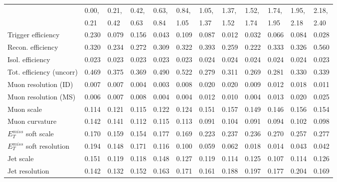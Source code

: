 {
\begin{table}
  \begin{center}
\tiny
\begin{tabular}{l|p{0.6cm}p{0.6cm}p{0.6cm}p{0.6cm}p{0.6cm}p{0.6cm}p{0.6cm}p{0.6cm}p{0.6cm}p{0.6cm}p{0.6cm}}
\hline
   & 0.00, & 0.21, & 0.42, & 0.63, & 0.84, & 1.05, & 1.37, & 1.52, & 1.74, & 1.95, & 2.18,  \\ 
   & 0.21 & 0.42 & 0.63 & 0.84 & 1.05 & 1.37 & 1.52 & 1.74 & 1.95 & 2.18 & 2.40  \\ 
\hline
Trigger efficiency                       & 0.230 & 0.079 & 0.156 & 0.043 & 0.109 & 0.087 & 0.012 & 0.032 & 0.066 & 0.084 & 0.028 \\
Recon. efficiency                        & 0.320 & 0.234 & 0.272 & 0.309 & 0.322 & 0.393 & 0.259 & 0.222 & 0.333 & 0.326 & 0.560 \\
Isol. efficiency                         & 0.023 & 0.023 & 0.023 & 0.023 & 0.023 & 0.024 & 0.024 & 0.024 & 0.024 & 0.024 & 0.023 \\
Tot. efficiency (uncorr)                 & 0.469 & 0.375 & 0.369 & 0.490 & 0.522 & 0.279 & 0.311 & 0.269 & 0.281 & 0.330 & 0.339 \\
Muon resolution (ID)                     & 0.007 & 0.007 & 0.004 & 0.003 & 0.008 & 0.020 & 0.020 & 0.009 & 0.012 & 0.018 & 0.011 \\
Muon resolution (MS)                     & 0.006 & 0.007 & 0.008 & 0.004 & 0.004 & 0.012 & 0.010 & 0.004 & 0.013 & 0.020 & 0.025 \\
Muon scale                               & 0.114 & 0.121 & 0.115 & 0.122 & 0.124 & 0.151 & 0.157 & 0.149 & 0.146 & 0.156 & 0.154 \\
Muon curvature                           & 0.142 & 0.141 & 0.112 & 0.115 & 0.113 & 0.091 & 0.104 & 0.091 & 0.094 & 0.102 & 0.098 \\
$E_{T}^{miss}$ soft scale                  & 0.170 & 0.159 & 0.154 & 0.177 & 0.169 & 0.223 & 0.237 & 0.236 & 0.270 & 0.257 & 0.277 \\
$E_{T}^{miss}$ soft resolution             & 0.194 & 0.148 & 0.171 & 0.116 & 0.100 & 0.059 & 0.062 & 0.018 & 0.014 & 0.043 & 0.042 \\
Jet scale                                & 0.151 & 0.119 & 0.118 & 0.148 & 0.127 & 0.119 & 0.114 & 0.125 & 0.107 & 0.114 & 0.126 \\
Jet resolution                           & 0.142 & 0.132 & 0.152 & 0.163 & 0.171 & 0.161 & 0.188 & 0.197 & 0.177 & 0.204 & 0.169 \\

\end{tabular}
\end{center}
\end{table}}
